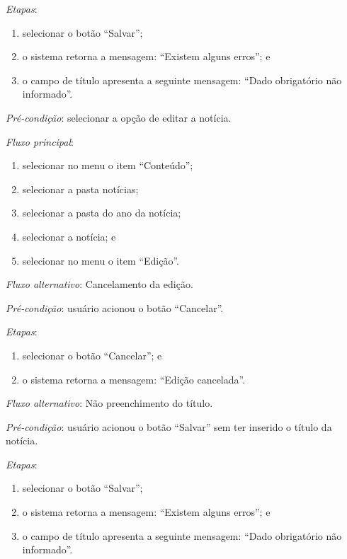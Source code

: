 \documentclass[a4paper,12pt]{article}
\begin{document}
\noindent \textit{Etapas}:

\begin{enumerate}
    \item selecionar o botão ``Salvar'';
    \item o sistema retorna a mensagem: ``Existem alguns erros''; e
    \item o campo de título apresenta a seguinte mensagem: ``Dado obrigatório não informado''.
\end{enumerate}




\vspace{0.7cm}

\noindent \textit{Pré-condição}: selecionar a opção de editar a notícia.

\noindent \textit{Fluxo principal}:

\begin{enumerate}
    \item selecionar no menu o item ``Conteúdo'';
    \item selecionar a pasta notícias;
    \item selecionar a pasta do ano da notícia;
    \item selecionar a notícia; e
    \item selecionar no menu o item ``Edição''.
\end{enumerate}

\noindent \textit{Fluxo alternativo}: Cancelamento da edição.

\noindent \textit{Pré-condição}: usuário acionou o botão ``Cancelar''.

\noindent \textit{Etapas}:

\begin{enumerate}
    \item selecionar o botão ``Cancelar''; e
    \item o sistema retorna a mensagem: ``Edição cancelada''.
\end{enumerate}

\noindent \textit{Fluxo alternativo}: Não preenchimento do título.

\noindent \textit{Pré-condição}: usuário acionou o botão ``Salvar'' sem ter inserido o título da notícia.

\noindent \textit{Etapas}:

\begin{enumerate}
    \item selecionar o botão ``Salvar'';
    \item o sistema retorna a mensagem: ``Existem alguns erros''; e
    \item o campo de título apresenta a seguinte mensagem: ``Dado obrigatório não informado''.
\end{enumerate}
\end{document}
